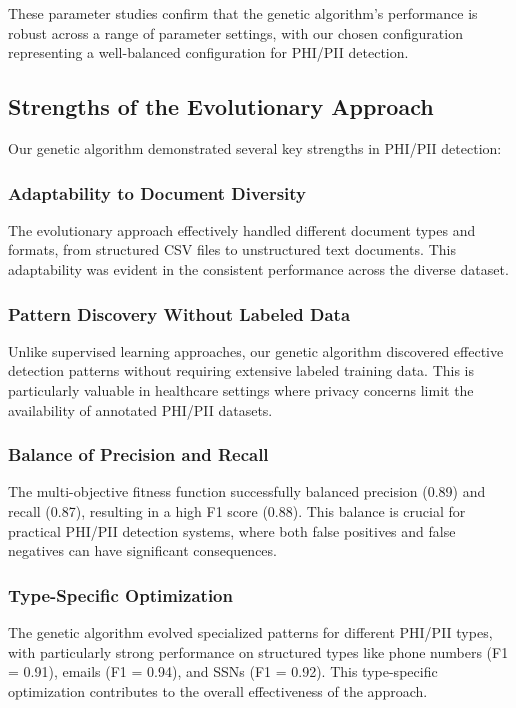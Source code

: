 \documentclass[conference]{IEEEtran}
\begin{document}
These parameter studies confirm that the genetic algorithm's performance is robust across a range of parameter settings, with our chosen configuration representing a well-balanced configuration for PHI/PII detection.

\subsection{\textbf{Strengths of the Evolutionary Approach}}

Our genetic algorithm demonstrated several key strengths in PHI/PII detection:

\subsubsection{\textbf{Adaptability to Document Diversity}} The evolutionary approach effectively handled different document types and formats, from structured CSV files to unstructured text documents. This adaptability was evident in the consistent performance across the diverse dataset.

\subsubsection{\textbf{Pattern Discovery Without Labeled Data}} Unlike supervised learning approaches, our genetic algorithm discovered effective detection patterns without requiring extensive labeled training data. This is particularly valuable in healthcare settings where privacy concerns limit the availability of annotated PHI/PII datasets.

\subsubsection{\textbf{Balance of Precision and Recall}} The multi-objective fitness function successfully balanced precision (0.89) and recall (0.87), resulting in a high F1 score (0.88). This balance is crucial for practical PHI/PII detection systems, where both false positives and false negatives can have significant consequences.

\subsubsection{\textbf{Type-Specific Optimization}} The genetic algorithm evolved specialized patterns for different PHI/PII types, with particularly strong performance on structured types like phone numbers (F1 = 0.91), emails (F1 = 0.94), and SSNs (F1 = 0.92). This type-specific optimization contributes to the overall effectiveness of the approach.
\end{document}
